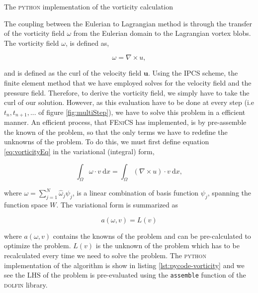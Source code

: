 	\begin{listing}[t]
	\inputminted[fontseries=courier,obeytabs,fontsize=\footnotesize,mathescape,linenos,numbersep=5pt,frame=lines,framesep=2mm,xleftmargin=20mm,xrightmargin=20mm]{python}{figures/eulerian/vorticity.py}
	\caption{The \textsc{python} implementation of the vorticity calculation}
	\label{lst:pycode-vorticity}
	\end{listing}

The coupling between the Eulerian to Lagrangian method is through the transfer of the vorticity field $\omega$ from the Eulerian domain to the Lagrangian vortex blobs. The vorticity field $\omega$, is defined as,

	\begin{equation}
	\omega = \nabla \times u,
	\label{eq:vorticityEq}
	\end{equation}

and is defined as the curl of the velocity field $\mathbf{u}$. Using the IPCS scheme, the finite element method that we have employed solves for the velocity field and the pressure field. Therefore, to derive the vorticity field, we simply have to take the curl of our solution. However, as this evaluation have to be done at every step (i.e $t_n, t_{n+1}, ...$ of figure \ref{fig:multiStep}), we have to solve this problem in a efficient manner. An efficient process, that \textsc{FEniCS} has implemented, is by pre-assemble the known of the problem, so that the only terms we have to redefine the unknowns of the problem. To do this, we must first define equation \ref{eq:vorticityEq} in the variational (integral) form, 

	\begin{equation}
	\int_{\Omega} \omega \cdot v\ \mathrm{d}x = \int_{\Omega} (\nabla \times u) \cdot v\ \mathrm{d}x,
	\end{equation}

where $\omega = \sum_{j=1}^N \hat{\omega}_j\psi_j$, is a linear combination of basis function $\psi_j$, spanning the function space $W$. The variational form is summarized as

	\begin{equation}
	a(\omega,v) = L(v)
	\end{equation}

where $a(\omega,v)$ contains the knowns of the problem and can be pre-calculated to optimize the problem. $L(v)$ is the unknown of the problem which has to be recalculated every time we need to solve the problem. The \textsc{python} implementation of the algorithm is show in listing \ref{lst:pycode-vorticity} and we see the $\mathrm{LHS}$ of the problem is pre-evaluated using the \texttt{assemble} function of the \textsc{dolfin} library.

